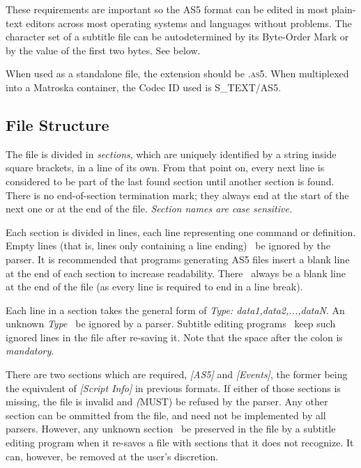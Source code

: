 \documentclass{spec}
\begin{document}
These requirements are important so the AS5 format can be edited in most plain-text editors
across most operating systems and languages without problems. The character set of a
subtitle file can be autodetermined by its Byte-Order Mark or by the value of the first
two bytes. See below.

When used as a standalone file, the extension should be \textsc{.as5}. When multiplexed
into a Matroska container, the Codec ID used is \textsc{S\_TEXT/AS5}.



\subsection{File Structure}
The file is divided in \emph{sections}, which are uniquely identified by a string inside
square brackets, in a line of its own. From that point on, every next line is considered
to be part of the last found section until another section is found. There is no end-of-section
termination mark; they always end at the start of the next one or at the end of the file.
\emph{Section names are case sensitive.}

Each section is divided in lines, each line representing one command or definition. Empty
lines (that is, lines only containing a line ending) \must\ be ignored by the parser.
It is recommended that programs generating AS5 files insert a blank line at the end of each
section to increase readability. There \must\ always be a blank line at the end of the file
(as every line is required to end in a line break).

Each line in a section takes the general form of \textit{Type: data1,data2,...,dataN}. An
unknown \textit{Type} \must\ be ignored by a parser. Subtitle editing programs \should\ keep
such ignored lines in the file after re-saving it. Note that the space after the colon is \emph{mandatory}.

There are two sections which are required, \emph{[AS5]} and \emph{[Events]}, the former being
the equivalent of \emph{[Script Info]} in previous formats. If either of those sections is
missing, the file is invalid and \emph(MUST) be refused by the parser. Any other section
can be ommitted from the file, and need not be implemented by all parsers. However, any unknown
section \must\ be preserved in the file by a subtitle editing program when it re-saves a
file with sections that it does not recognize. It can, however, be removed at the user's discretion.
\end{document}
